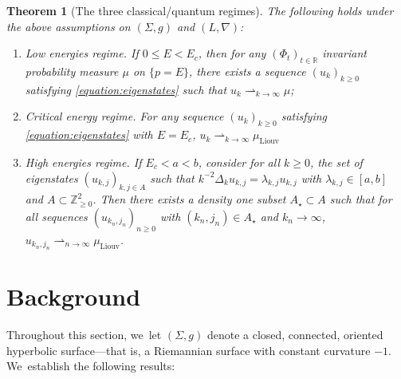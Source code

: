 \documentclass[10pt,a4paper]{amsart}
\theoremstyle{plain}
\newtheorem{theorem}{Theorem}[section]
\theoremstyle{definition}
\newcommand{\R}{\mathbb{R}}
\newcommand{\Z}{\mathbb{Z}}
\begin{document}
\begin{theorem}[The three classical/quantum regimes]
\label{theorem:main}
The following holds under the above assumptions on $(\Sigma,g)$ and $(L,\nabla)$:
\begin{enumerate}

\item\label{theorem:maini} \emph{Low energies regime.} If $0 \leq E < E_c$, then for any $(\Phi_t)_{t \in \R}$ invariant probability measure $\mu$ on $\{p=E\}$, there exists a sequence $(u_{k})_{k \geq 0}$ satisfying \eqref{equation:eigenstates} such that $u_{k} \rightharpoonup_{k \to \infty} \mu$;

\item\label{theorem:mainii} \emph{Critical energy regime.} For any
sequence $(u_k)_{k \geq 0}$ satisfying \eqref{equation:eigenstates} with $E=E_c$, $u_{k} \rightharpoonup_{k \to \infty} \mu_{\mathrm{Liouv}}$

\item\label{theorem:mainiii} \emph{High energies regime.} If $E_c < a < b$, consider for
all $k \geq 0$, the set of eigenstates $(u_{k,j})_{k,j \in A}$ such that
$k^{-2} \Delta_k u_{k,j} = \lambda_{k,j} u_{k,j}$ with $\lambda_{k,j} \in
[a,b]$ and $A \subset \Z_{\geq 0}^2$. Then there exists a density one subset
$A_\star \subset A$ such that for all sequences $(u_{k_n,j_n})_{n \geq 0}$
with $(k_n,j_n) \in A_\star$ and $k_n \to \infty$, $u_{k_n,j_n} \rightharpoonup_{n \to \infty} \mu_{\mathrm{Liouv}}$.
\end{enumerate}
\end{theorem}
\section{Background}

\label{section:dynamical-geometric-background}

Throughout this section, we~let $(\Sigma, g)$ denote a closed, connected, oriented hyperbolic surface—that is, a Riemannian surface with constant curvature $-1$. We~establish the following results:
\end{document}
